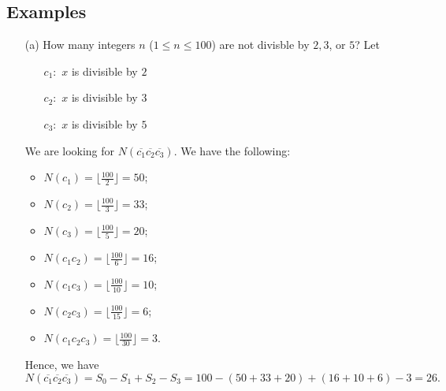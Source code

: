 \documentclass[11pt]{article}
\begin{document}
    \subsection{Examples}
    \begin{enumerate}
        \item[(a)] How many integers $n$ (\(1 \leq n \leq 100\)) are not divisble by \(2,3\), or $5$? Let
        \begin{enumerate}
            \item[] \(c_1:\) $x$ is divisible by $2$
            \item[] \(c_2:\) $x$ is divisible by $3$
            \item[] \(c_3:\) $x$ is divisible by $5$   
        \end{enumerate}
        We are looking for \(N(\overline{c_1} \overline{c_2} \overline{c_3})\). We have the following:
        \begin{itemize}
            \item \(N(c_1) = \lfloor \frac{100}{2} \rfloor = 50\);
            \item \(N(c_2) = \lfloor \frac{100}{3} \rfloor = 33\);
            \item \(N(c_3) = \lfloor \frac{100}{5} \rfloor = 20\);
            \item \(N(c_1 c_2) = \lfloor \frac{100}{6} \rfloor = 16\);
            \item \(N(c_1 c_3) = \lfloor \frac{100}{10} \rfloor = 10\);
            \item \(N(c_2 c_3) = \lfloor \frac{100}{15} \rfloor = 6\);
            \item \(N(c_1 c_2 c_3) = \lfloor \frac{100}{30} \rfloor = 3\).
        \end{itemize}
        Hence, we have \[N(\overline{c_1} \overline{c_2} \overline{c_3}) = S_0 - S_1 + S_2 - S_3 = 100 - (50 + 33 + 20) + (16 + 10 + 6) - 3 = 26.\]


\end{enumerate}
\end{document}
